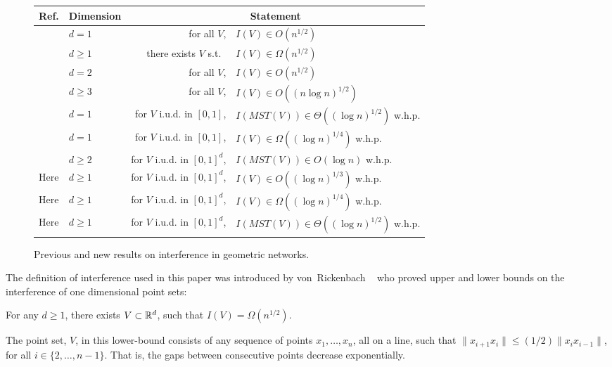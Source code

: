 \documentclass{patmorin}
\newcommand{\mst}{\mathit{MST}}
\begin{document}
\begin{figure}
\begin{center}
  \begin{tabular}{|l|l|r@{ }l|}\hline
    Ref. & Dimension & \multicolumn{2}{c|}{Statement} \\ \hline
    \cite{vR05} & $d=1$ & for all $V$, & $I(V)\in O(n^{1/2})$ \\
    \cite{vR05} & $d\ge 1$ & there exists $V$ s.t.\ & $I(V)\in \Omega(n^{1/2})$ \\
    \cite{ht08} & $d=2$ & for all $V$, & $I(V)\in O(n^{1/2})$ \\
    \cite{ht08} & $d\ge 3$ & for all $V$, & $I(V)\in O((n\log n)^{1/2})$ \\
    \cite{kkmns10} & $d= 1$ & for $V$ i.u.d. in $[0,1]$, & $I(\mst(V))\in \Theta((\log n)^{1/2})$ w.h.p. \\
    \cite{kkmns10,vR05} & $d = 1$ & for $V$ i.u.d. in $[0,1]$, & $I(V)\in\Omega((\log n)^{1/4})$ w.h.p.  \\
    \cite{kdh11} & $d\ge 2$ & for $V$ i.u.d. in $[0,1]^d$, & $I(\mst(V))\in O(\log n)$ w.h.p.  \\
    Here & $d\ge 1$ & for $V$ i.u.d. in $[0,1]^d$, & $I(V)\in O((\log n)^{1/3})$ w.h.p.  \\
    Here & $d\ge 1$ & for $V$ i.u.d. in $[0,1]^d$,  & $I(V)\in \Omega((\log n)^{1/4})$ w.h.p.  \\ 
    Here & $d\ge 1$ & for $V$ i.u.d. in $[0,1]^d$, & $I(\mst(V))\in \Theta((\log n)^{1/2})$ w.h.p.  \\ \hline
  \end{tabular}
\end{center}
\caption{Previous and new results on interference in geometric networks.}
\end{figure}

The definition of interference used in this paper was introduced by
von~Rickenbach \etal\ \cite{vR05} who proved upper and
lower bounds on the interference of one dimensional point sets:
\begin{thm}
For any $d\ge 1$, there exists $V\subset\mathbb{R}^{d}$, such
that $I(V)=\Omega(n^{1/2})$.
\end{thm}
The point set, $V$, in this lower-bound consists of any sequence of
points $x_1,\ldots,x_n$, all on a line, such that $\|x_{i+1}x_i\| \le (1/2)\|x_{i}x_{i-1}\|$,
for all $i\in\{2,\ldots,n-1\}$.  That is, the gaps between consecutive
points decrease exponentially.
\end{document}
